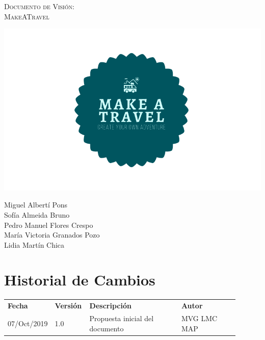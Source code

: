 \documentclass[11pt]{article}
\begin{document}
\begin{titlepage}
\centering
\vspace{4.5cm}
{\scshape\LARGE Documento de Visión:\\MakeATravel \par}
\vspace{1.5cm}

\includegraphics[width=16cm]{Logo}

\vspace{3cm}
{\scshape\large \par}
\vspace{1cm}

{Miguel Albertí Pons\\
Sofía Almeida Bruno\\
Pedro Manuel Flores Crespo\\
María Victoria Granados Pozo\\
Lidia Martín Chica
\par}

\end{titlepage}
\newpage

\section*{Historial de Cambios}
\begin{table}[H]
  \centering
  \begin{tabular}{p{0.1\linewidth}p{0.15\linewidth}p{0.4\linewidth}p{0.25\linewidth}}
    \toprule
    \textbf{Fecha} & \textbf{Versión} & \textbf{Descripción} & \textbf{Autor}\\
    07/Oct/2019 & 1.0 & Propuesta inicial del documento & MVG LMC MAP\\
    \midrule
    \bottomrule
  \end{tabular}
\end{table}
\newpage
\end{document}
